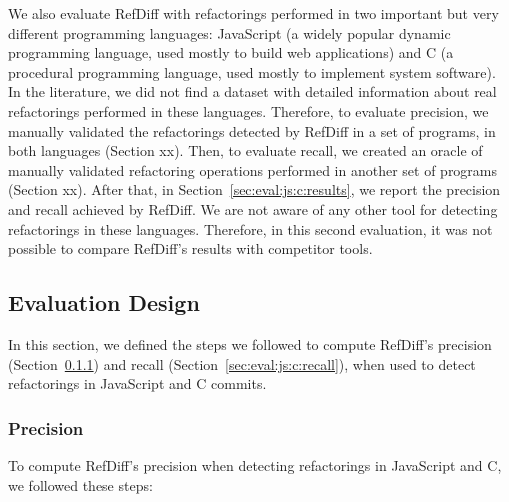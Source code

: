 We also evaluate RefDiff with refactorings performed in two important but very different programming languages: JavaScript (a widely popular dynamic programming language, used mostly to build web applications) and C (a procedural programming language, used mostly to implement system software).
In the literature, we did not find a dataset with detailed information about real refactorings performed in these languages. Therefore, to evaluate precision, we manually validated the refactorings detected by RefDiff in a set of programs, in both languages (Section xx). Then, to evaluate recall, we created an oracle of manually validated refactoring operations performed in another set of programs (Section xx).  After that, in Section~\ref{sec:eval:js:c:results}, we report the precision and recall achieved by RefDiff.  We are not aware of any other tool for detecting refactorings in these languages. Therefore, in this second evaluation, it was not possible to compare RefDiff's results with competitor tools.

\subsection{Evaluation Design}
\label{sec:eval:js:c:design}

In this section, we defined the steps we followed to compute RefDiff's precision (Section~\ref{sec:eval:js:c:precision})
and recall (Section~\ref{sec:eval:js:c:recall}), when used to detect refactorings in JavaScript and C commits.

\subsubsection{Precision}
\label{sec:eval:js:c:precision}


To compute RefDiff's precision when detecting refactorings in JavaScript and C, we followed these steps:

